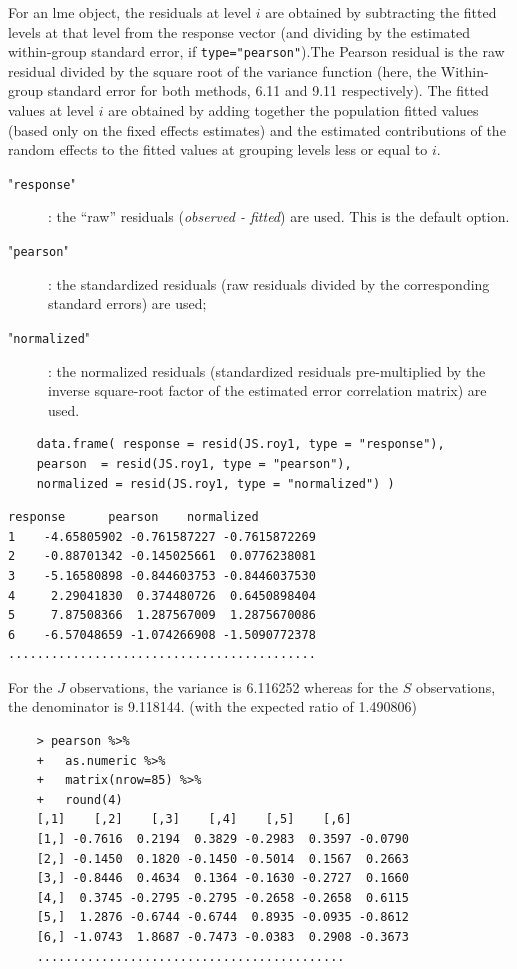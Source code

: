 \documentclass[Main.tex]{subfiles}
\begin{document}
For an lme object, the residuals at level $i$ are obtained by subtracting the fitted levels at that level from the response vector (and dividing by the estimated within-group standard error, if \texttt{type="pearson"}).The Pearson residual is the raw residual divided by the square root of the variance function (here, the Within-group standard error for both methods, 6.11 and 9.11 respectively). The fitted values at level $i$ are obtained by adding together the population fitted values (based only on the fixed effects estimates) and the estimated contributions of the random effects to the fitted values at grouping levels less or equal to $i$.

\begin{description}
	\item["\texttt{response}"]: the “raw” residuals (\textit{observed - fitted}) are used. This is the default option.
	\item["\texttt{pearson}"]: the standardized residuals (raw residuals divided by the corresponding standard errors) are used; 
	\item["\texttt{normalized}"]: the normalized residuals (standardized residuals pre-multiplied by the inverse square-root factor of the estimated error correlation matrix) are used.
\end{description}

\begin{framed}
	\begin{verbatim}
	data.frame( response = resid(JS.roy1, type = "response"), 
	pearson  = resid(JS.roy1, type = "pearson"), 
	normalized = resid(JS.roy1, type = "normalized") )
	\end{verbatim}
\end{framed}

\begin{verbatim}
response      pearson    normalized
1    -4.65805902 -0.761587227 -0.7615872269
2    -0.88701342 -0.145025661  0.0776238081
3    -5.16580898 -0.844603753 -0.8446037530
4     2.29041830  0.374480726  0.6450898404
5     7.87508366  1.287567009  1.2875670086
6    -6.57048659 -1.074266908 -1.5090772378
...........................................
\end{verbatim}
For the $J$ observations, the variance is 6.116252 whereas for the $S$ observations, the denominator is 9.118144. (with the expected ratio of  1.490806)


\begin{framed}
	\begin{verbatim}
	> pearson %>%
	+   as.numeric %>% 
	+   matrix(nrow=85) %>%
	+   round(4) 
	[,1]    [,2]    [,3]    [,4]    [,5]    [,6]
	[1,] -0.7616  0.2194  0.3829 -0.2983  0.3597 -0.0790
	[2,] -0.1450  0.1820 -0.1450 -0.5014  0.1567  0.2663
	[3,] -0.8446  0.4634  0.1364 -0.1630 -0.2727  0.1660
	[4,]  0.3745 -0.2795 -0.2795 -0.2658 -0.2658  0.6115
	[5,]  1.2876 -0.6744 -0.6744  0.8935 -0.0935 -0.8612
	[6,] -1.0743  1.8687 -0.7473 -0.0383  0.2908 -0.3673
	...........................................
	
	\end{verbatim}
\end{framed}
\end{document}
